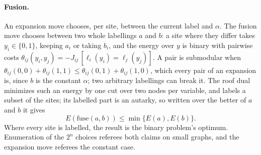 \documentclass[11pt,a4paper]{article}
\begin{document}
\paragraph{Fusion.}
An expansion move chooses, per site, between the current label and
$\alpha$. The fusion move \citep{lempitsky2010} chooses between two whole
labellings $a$ and $b$: a site where they differ takes $y_i \in \{0, 1\}$,
keeping $a_i$ or taking $b_i$, and the energy over $y$ is binary with pairwise
costs $\theta_{ij}(y_i, y_j) = -J_{ij}\,[\ell_i(y_i) = \ell_j(y_j)]$. A pair is
submodular when $\theta_{ij}(0,0) + \theta_{ij}(1,1) \le \theta_{ij}(0,1) +
\theta_{ij}(1,0)$, which every pair of an expansion is, since $b$ is the
constant $\alpha$; two arbitrary labellings can break it. The roof dual
\citep{kolmogorov2007} minimizes such an energy by one cut over two nodes per
variable, and labels a subset of the sites; its labelled part is an autarky,
so written over the better of $a$ and $b$ it gives
\begin{equation}
  E(\mathrm{fuse}(a, b)) \le \min\{E(a), E(b)\}.
  \label{eq:fusion}
\end{equation}
Where every site is labelled, the result is the binary problem's optimum.
Enumeration of the $2^n$ choices referees both claims on small graphs, and
the expansion move referees the constant case.
\end{document}
